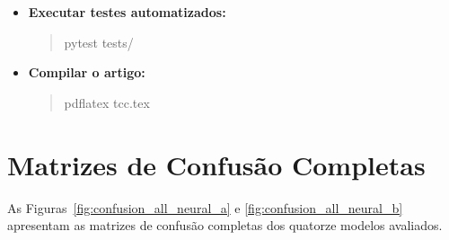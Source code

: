 \documentclass[12pt,a4paper]{article}
\begin{document}
\begin{itemize}
    \item \textbf{Executar testes automatizados:}
    \begin{quote}\footnotesize\ttfamily
    pytest tests/
    \end{quote}

    \item \textbf{Compilar o artigo:}
    \begin{quote}\footnotesize\ttfamily
    pdflatex tcc.tex
    \end{quote}
\end{itemize}

\section{Matrizes de Confusão Completas}

As Figuras~\ref{fig:confusion_all_neural_a} e
\ref{fig:confusion_all_neural_b} apresentam as matrizes de confusão completas
dos quatorze modelos avaliados.
\end{document}
